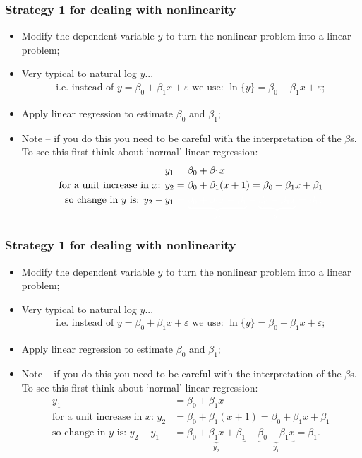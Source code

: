 \documentclass[aspectratio=169]{beamer}
\theoremstyle{principle}
\begin{document}
\begin{frame}
\frametitle{Strategy 1 for dealing with nonlinearity}

\begin{itemize}
\item Modify the dependent variable $y$ to turn the nonlinear problem into a linear problem;
\item Very typical to natural log $y$...
\begin{align*}
\mbox{i.e. instead of }y = \beta_0 + \beta_1x + \varepsilon\mbox{ we use: }\ln\{y\} = \beta_0 + \beta_1x + \varepsilon;
\end{align*}
\item Apply linear regression to estimate $\beta_0$ and $\beta_1$;
\item Note -- if you do this you need to be careful with the interpretation of the $\beta$s.  To see this first think about `normal' linear regression:
\begin{align*}
y_1 &= \beta_0 + \beta_1x\\
\mbox{for a unit increase in $x$: } y_2 &= \beta_0 + \beta_1(x + 1) = \beta_0 + \beta_1x + \beta_1\\
\mbox{so change in $y$ is: }y_2 - y_1 &\color{white}= \underbrace{\beta_0 + \beta_1x + \beta_1}_{y_2} - \underbrace{\beta_0 - \beta_1x}_{y_1} = \beta_1.
\end{align*}

\end{itemize}

\end{frame}

\begin{frame}
\frametitle{Strategy 1 for dealing with nonlinearity}

\begin{itemize}
\item Modify the dependent variable $y$ to turn the nonlinear problem into a linear problem;
\item Very typical to natural log $y$...
\begin{align*}
\mbox{i.e. instead of }y = \beta_0 + \beta_1x + \varepsilon\mbox{ we use: }\ln\{y\} = \beta_0 + \beta_1x + \varepsilon;
\end{align*}
\item Apply linear regression to estimate $\beta_0$ and $\beta_1$;
\item Note -- if you do this you need to be careful with the interpretation of the $\beta$s.  To see this first think about `normal' linear regression:
\begin{align*}
y_1 &= \beta_0 + \beta_1x\\
\mbox{for a unit increase in $x$: } y_2 &= \beta_0 + \beta_1(x + 1) = \beta_0 + \beta_1x + \beta_1\\
\mbox{so change in $y$ is: }y_2 - y_1 &= \underbrace{\beta_0 + \beta_1x + \beta_1}_{y_2} - \underbrace{\beta_0 - \beta_1x}_{y_1} = \beta_1.
\end{align*}

\end{itemize}

\end{frame}
\end{document}
